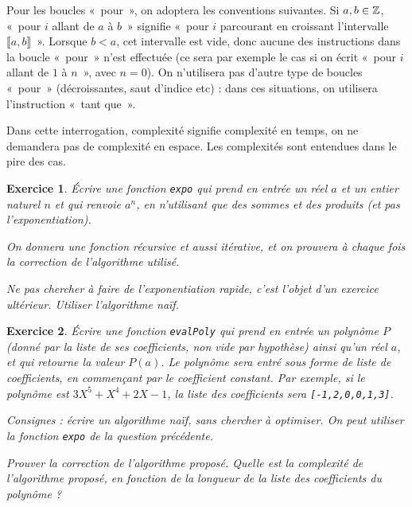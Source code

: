 \documentclass[11pt,a4paper]{article}
\newtheorem{ex}{Exercice}
\begin{document}
\bigskip

Pour les boucles «~pour~», on adoptera les conventions suivantes. Si $a,b\in \mathbb{Z}$, «~pour $i$ allant de $a$ à $b$~» signifie «~pour $i$ parcourant en croissant l'intervalle $\llbracket a,b\rrbracket$~». Lorsque $b<a$, cet intervalle est vide, donc aucune des instructions dans la boucle «~pour~» n'est effectuée (ce sera par exemple le cas si on écrit «~pour $i$ allant de $1$ à $n$~», avec $n=0$). On n'utilisera pas d'autre type de boucles «~pour~» (décroissantes, saut d'indice etc) : dans ces situations, on utilisera l'instruction «~tant que~».


Dans cette interrogation, \og complexité\fg{} signifie \og complexité en temps\fg, on ne demandera pas de complexité en espace. Les complexités sont entendues dans le pire des cas.

\begin{ex}
Écrire une fonction \verb+expo+ qui prend en entrée un réel $a$ et un entier naturel $n$ et qui renvoie $a^n$, en n'utilisant que des sommes et des produits (et pas l'exponentiation).

On donnera une fonction récursive et aussi itérative, et on prouvera à chaque fois la correction de l'algorithme utilisé.

Ne pas chercher à faire de l'exponentiation rapide, c'est l'objet d'un exercice ultérieur. Utiliser l'algorithme naïf.
\end{ex}

\begin{ex}
Écrire une fonction \verb+evalPoly+ qui prend en entrée un polynôme $P$ (donné par la liste de ses coefficients, non vide par hypothèse) ainsi qu'un réel $a$, et qui retourne la valeur $P(a)$. Le polynôme sera entré sous forme de liste de coefficients, en commençant par le coefficient constant. Par exemple, si le polynôme est $3X^5+X^4+2X-1$, la liste des coefficients sera \verb+[-1,2,0,0,1,3]+. 

Consignes : écrire un algorithme naïf, sans chercher à optimiser. On peut utiliser la fonction \verb+expo+ de la question précédente.

Prouver la correction de l'algorithme proposé.
Quelle est la complexité de l'algorithme proposé, en fonction de la longueur de la liste des coefficients du polynôme ?
\end{ex}
\end{document}
